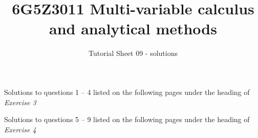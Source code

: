 \documentclass[a4paper]{amsart}
\begin{document}
\title{6G5Z3011 Multi-variable calculus and analytical methods}
\author{Tutorial Sheet 09 - solutions}
\maketitle

Solutions to questions 1 -- 4 listed on the following pages under the heading of \textit{Exercise 3}

Solutions to questions 5 -- 9 listed on the following pages under the heading of \textit{Exercise 4}


\end{document}
